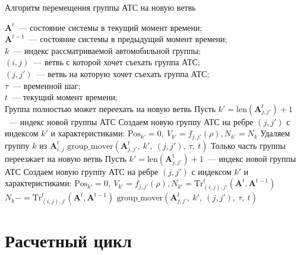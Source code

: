 \begin{algorithm}[!ht]
    \caption{Алгоритм перемещения группы АТС на новую ветвь}
    \label{group_transferrer}
    \begin{algorithmic}
        \REQUIRE \(\mathbf{A}^t\)~--- состояние системы в текущий момент времени; \\
                 \(\mathbf{A}^{t-1}\)~--- состояние системы в предыдущий момент времени; \\
                 \(k\)~--- индекс рассматриваемой автомобильной группы; \\
                 \((i,j)\)~--- ветвь с которой хочет съехать группа АТС; \\
                 \((j,j')\)~--- ветвь на которую хочет съехать группа АТС; \\
                 \(\tau\)~--- временной шаг; \\
                 \(t\)~--- текущий момент времени; \\
            \STATE Группа полностью может переехать на новую ветвь
            \STATE Пусть \(k' = \text{len}(\mathbf{A}^t_{j,j'}) + 1\)~--- индекс новой группы АТС
            \STATE Создаем новую группу АТС на ребре \((j,j')\) с индексом \(k'\) и характеристиками:
            \STATE \(\mathrm{Pos}_{k'}  = 0,\ V_{k'}  = f_{j,j'}(\rho), N_{k'} = N_k\)
            \STATE Удаляем группу \(k\) из \(\mathbf{A}^t_{i,j}\)
            \STATE \(\text{group\_mover}(\mathbf{A}^t_{j,j'},\ k',\ (j,j'),\ \tau,\ t)\)
        \ELSE
            \STATE Только часть группы переезжает на новую ветвь
            \STATE Пусть \(k' = \text{len}(\mathbf{A}^t_{j,j'}) + 1\)~--- индекс новой группы АТС
            \STATE Создаем новую группу АТС на ребре \((j,j')\) с индексом \(k'\) и характеристиками:
            \STATE \(\mathrm{Pos}_{k'}  = 0,\ V_{k'}  = f_{j,j'}(\rho), N_{k'} = \text{Tr}_{(i, j), j'}^t (\mathbf{A}^t, \mathbf{A}^{t-1})\)
            \STATE \(N_k -= \text{Tr}_{(i, j), j'}^t (\mathbf{A}^t, \mathbf{A}^{t-1})\)
            \STATE \(\text{group\_mover}(\mathbf{A}^t_{j,j'},\ k',\ (j,j'),\ \tau,\ t)\)
        \ENDIF
    \end{algorithmic}
\end{algorithm}

\section{Расчетный цикл}
\label{sec:calc_loop}

